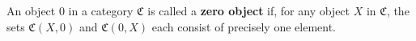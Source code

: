An object $0$ in a category $\mathfrak{C}$ is called a \textbf{zero object} if, for any object $X$ in $\mathfrak{C}$, the sets $\mathfrak{C}(X, 0)$ and $\mathfrak{C}(0, X)$ each consist of precisely one element.
